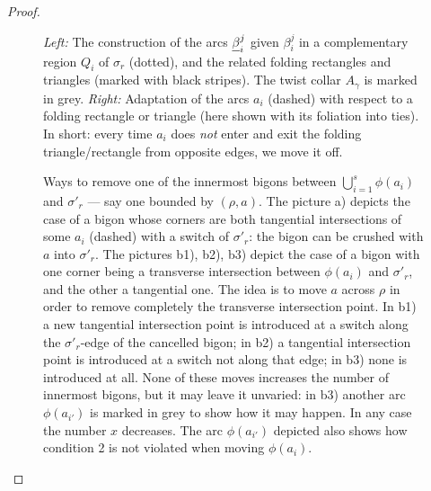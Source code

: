 \begin{proof}
\begin{figure}
\centering
\begin{minipage}[c]{.5\textwidth}
\def\svgwidth{\textwidth}

\end{minipage}\hspace{5em}
\begin{minipage}[c]{.35\textwidth}
\def\svgwidth{\textwidth}

\end{minipage} 
\caption{\label{fig:diagext_efficientpos}\textit{Left:} The construction of the arcs $\underline{\beta}_i^j$ given $\beta_i^j$ in a complementary region $Q_i$ of $\sigma_r$ (dotted), and the related folding rectangles and triangles (marked with black stripes). The twist collar $A_\gamma$ is marked in grey. \textit{Right:} Adaptation of the arcs $a_i$ (dashed) with respect to a folding rectangle or triangle (here shown with its foliation into ties). In short: every time $a_i$ does \emph{not} enter and exit the folding triangle/rectangle from opposite edges, we move it off.}
\end{figure}
\begin{figure}
\centering
\def\svgwidth{.8\textwidth}

\caption{\label{fig:diagext_furtheradjust}Ways to remove one of the innermost bigons between $\bigcup_{i=1}^{s} \phi(a_i)$ and $\sigma'_r$ --- say one bounded by $(\rho,a)$. The picture a) depicts the case of a bigon whose corners are both tangential intersections of some $a_i$ (dashed) with a switch of $\sigma'_r$: the bigon can be crushed with $a$ into $\sigma'_r$. The pictures b1), b2), b3) depict the case of a bigon with one corner being a transverse intersection between $\phi(a_i)$ and $\sigma'_r$, and the other a tangential one. The idea is to move $a$ across $\rho$ in order to remove completely the transverse intersection point. In b1) a new tangential intersection point is introduced at a switch along the $\sigma'_r$-edge of the cancelled bigon; in b2) a tangential intersection point is introduced at a switch not along that edge; in b3) none is introduced at all. None of these moves increases the number of innermost bigons, but it may leave it unvaried: in b3) another arc $\phi(a_{i'})$ is marked in grey to show how it may happen. In any case the number $x$ decreases. The arc $\phi(a_{i'})$ depicted also shows how condition 2 is not violated when moving $\phi(a_i)$.}
\end{figure}


\end{proof}
